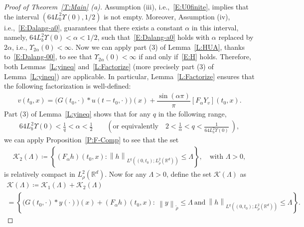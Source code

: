 \documentclass[sn-mathphys]{sn-jnl}%
\newcommand{\BR}{\mathbb{R}}
\newcommand{\Norm}[1]{\left\| #1 \right\|}
\numberwithin{equation}{section}
\theoremstyle{thmstyleone}%
\theoremstyle{thmstyletwo}%
\theoremstyle{thmstylethree}%
\begin{document}
\begin{proof}[Proof of Theorem~\ref{T:Main} (a)]
  Assumption (iii), i.e.,~\eqref{E:U0finite}, implies that the interval $\left(64L_b^2 \Upsilon(0),
  1/2\right)$ is not empty. Moreover, Assumption (iv), i.e.,~\eqref{E:Dalang-a0}, guarantees that
  there exists a constant $\alpha$ in this interval, namely, $64L_b^2\Upsilon(0) <\alpha<1/2$, such
  that~\eqref{E:Dalang-a0} holds with $\alpha$ replaced by $2\alpha$, i.e.,
  $\Upsilon_{2\alpha}(0)<\infty$. Now we can apply part (3) of Lemma~\ref{L:HUA}, thanks
  to~\eqref{E:Dalang-00}, to see that $\Upsilon_{2\alpha}(0)<\infty$ if and only if~\eqref{E:H}
  holds. Therefore, both Lemmas~\ref{L:yineq} and~\ref{L:Factorize} (more precisely part (3) of
  Lemma~\ref{L:yineq}) are applicable. In particular, Lemma~\ref{L:Factorize} ensures that the
  following factorization is well-defined:
  \begin{align}\label{E:Fact}
    v(t_0,x) = \Big(G(t_0,\cdot) * u(t-t_0,\cdot)\Big)(x) +\dfrac{\sin(\alpha \pi)}{\pi} \left[F_\alpha Y_v\right](t_0,x).
  \end{align}
  Part (3) of Lemma~\ref{L:yineq} shows that for any $q$ in the following range,
  \begin{align}\label{E:Choice}
    64 L_b^2 \Upsilon(0) < \frac{1}{q} < \alpha <\frac{1}{2}
    \qquad \left(\text{or equivalently} \quad
    2< \frac{1}{\alpha} < q < \frac{1}{64 L_b^2 \Upsilon(0)}\:\right),
  \end{align}
  we can apply Proposition~\ref{P:F-Comp} to see that the set
  \begin{align*}
    \mathscr{K}_2 (\Lambda)\coloneqq
    \left\{(F_\alpha h)(t_0,x): \Norm{h}_{L^q\left((0,t_0);L^2_{\tilde{\rho}}\left(\BR^d\right)\right)} \le \Lambda \right\},
    \quad \text{with $\Lambda>0$},
  \end{align*}
  is relatively compact in $L_\rho^2 (\BR^d)$. Now for any $\Lambda>0$, define the set $\mathscr{K}
  (\Lambda)$ as
  \begin{multline*}
    \mathscr{K} (\Lambda) \coloneqq \mathscr{K}_1 (\Lambda) + \mathscr{K}_2 (\Lambda) \\
    = \left\{\big(G(t_0,\cdot)*y(\cdot)\big)(x)+(F_\alpha h)(t_0, x): \:\Norm{y}_{\tilde{\rho}}
    \le \Lambda~\text{and}~\Norm{h}_{L^q\left((0,t_0);L^2_{\tilde{\rho}}\left(\BR^d\right)\right)} \le \Lambda \right\}.
  \end{multline*}


\end{proof}
\end{document}
